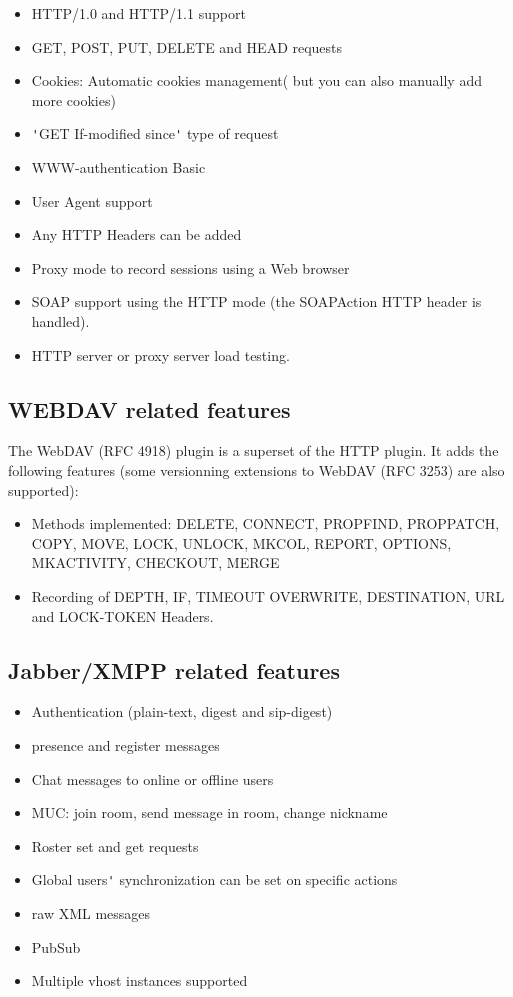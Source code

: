 \documentclass{TSUNG-en}
\begin{document}
\begin{itemize}
\item HTTP/1.0 and HTTP/1.1 support
\item GET, POST, PUT, DELETE and HEAD requests
\item Cookies: Automatic cookies management( but you can also manually
  add more cookies)
\item \verb|'|GET If-modified since\verb|'| type of request
\item WWW-authentication Basic
\item User Agent support
\item Any HTTP Headers can be added
\item Proxy mode to record sessions using a Web browser
\item SOAP support using the HTTP mode (the SOAPAction HTTP header is
  handled).
\item HTTP server or proxy server load testing.
\end{itemize}

\subsection{WEBDAV related features}

The WebDAV (RFC 4918) plugin is a superset of the HTTP plugin. It adds the
following features (some versionning extensions to WebDAV (RFC 3253)
are also supported):

\begin{itemize}
\item Methods implemented: DELETE, CONNECT, PROPFIND, PROPPATCH, COPY,
  MOVE, LOCK, UNLOCK, MKCOL, REPORT, OPTIONS, MKACTIVITY, CHECKOUT, MERGE
\item Recording of DEPTH, IF, TIMEOUT OVERWRITE, DESTINATION, URL and
  LOCK-TOKEN Headers.
\end{itemize}

\subsection{Jabber/XMPP related features}

\begin{itemize}
\item Authentication (plain-text, digest and sip-digest)
\item presence and register messages
\item Chat messages to online or offline users
\item MUC: join room, send message in room, change nickname
\item Roster set and get requests
\item Global users\verb|'| synchronization can be set on specific actions
\item raw XML messages
\item PubSub
\item Multiple vhost instances supported
\end{itemize}
\end{document}
